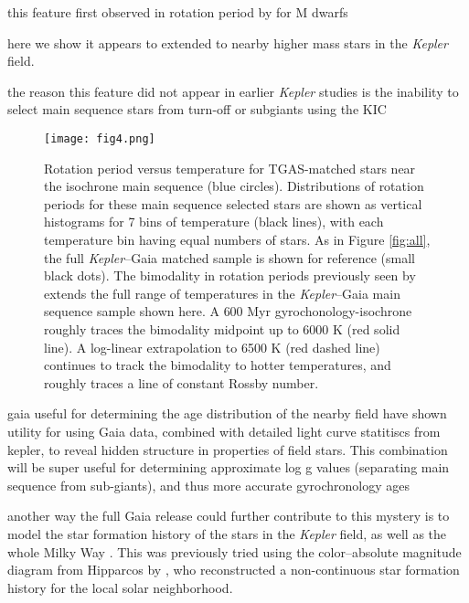 \documentclass[manuscript, letterpaper]{aastex6}
\makeatletter
\let\origsection\section
\renewcommand\section{\@ifstar{\starsection}{\nostarsection}}
\newcommand\nostarsection[1]{\sectionprelude\origsection{#1}}
\newcommand\starsection[1]{\sectionprelude\origsection*{#1}}
\newcommand\sectionprelude{\vspace{1em}}
\newcommand{\Kepler}{\textsl{Kepler}\xspace}
\makeatother
\begin{document}
\section{Extending the Spin-Down Gap}

this feature first observed in rotation period by \citet{mcquillan2013} for M dwarfs

here we show it appears to extended to nearby higher mass stars in the \Kepler field.

the reason this feature did not appear in earlier \Kepler studies is the inability to select main sequence stars from turn-off or subgiants using the KIC


\begin{figure}[]
\centering
\texttt{[image: fig4.png]}
\caption{ Rotation period versus temperature for TGAS-matched stars near the isochrone main sequence (blue circles). Distributions of rotation periods for these main sequence selected stars are shown as vertical histograms for 7 bins of temperature (black lines), with each temperature bin having equal numbers of stars. As in Figure \ref{fig:all}, the full \Kepler--Gaia matched sample is shown for reference (small black dots). The bimodality in rotation periods previously seen by \citet{mcquillan2014} extends the full range of temperatures in the \Kepler--Gaia main sequence sample shown here.
A \citet{meibom2011} 600 Myr gyrochonology-isochrone roughly traces the bimodality midpoint up to 6000 K (red solid line). A log-linear extrapolation to 6500 K (red dashed line) continues to track the bimodality to hotter temperatures, and roughly traces a line of constant Rossby number.
}
\label{fig:gyro}
\end{figure}




\section{Discussion}
gaia useful for determining the age distribution of the nearby field
have shown utility for using Gaia data, combined with detailed light curve statitiscs from kepler, to reveal hidden structure in properties of field stars. This combination will be super useful for determining approximate log g values (separating main sequence from sub-giants), and thus more accurate gyrochronology ages \citep{van-saders2013}

another way the full Gaia release could further contribute to this mystery is to model the star formation history of the stars in the \Kepler field, as well as the whole Milky Way \citep[e.g.][]{bertelli1999}. This was previously tried using the color--absolute magnitude diagram from Hipparcos by \citet{hernandez2000}, who reconstructed a non-continuous star formation history for the local solar neighborhood.
\end{document}
